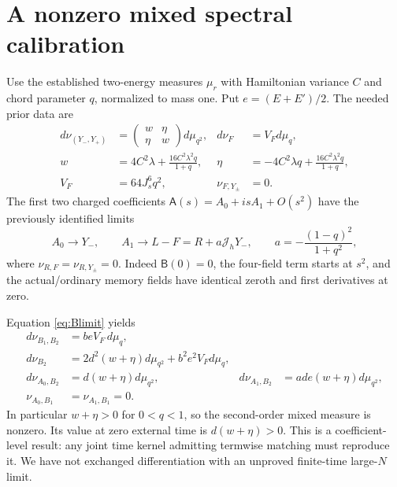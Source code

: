 \documentclass[11pt,a4paper]{article}
\newcommand{\AA}{\mathsf A}
\newcommand{\BB}{\mathsf B}
\newcommand{\Jh}{\mathcal J_h}
\begin{document}
\section{A nonzero mixed spectral calibration}
Use the established two-energy measures $\mu_r$ with Hamiltonian
variance $C$ and chord parameter $q$, normalized to mass one.
Put $e=(E+E')/2$. The needed prior data \cite{Central,Mixed} are
\begin{align}
 d\nu_{(Y_-,Y_+)}&=
 \begin{pmatrix}w&\eta\\\eta&w\end{pmatrix}d\mu_{q^2},
 &d\nu_F&=V_Fd\mu_q,\\
 w&=4C^2\lambda+\frac{16C^2\lambda^2q}{1+q},
 &\eta&=-4C^2\lambda q+\frac{16C^2\lambda^2q}{1+q},\\
 V_F&=64J_s^6q^2,&\nu_{F,Y_\pm}&=0.
\end{align}
The first two charged coefficients $\AA(s)=A_0+isA_1+O(s^2)$
have the previously identified limits
\begin{equation}
 A_0\to Y_-,\qquad A_1\to L-F=R+a\Jh Y_-,\qquad
 a=-\frac{(1-q)^2}{1+q^2},
\end{equation}
where $\nu_{R,F}=\nu_{R,Y_\pm}=0$. Indeed $\BB(0)=0$, the
four-field term starts at $s^2$, and the actual/ordinary memory
fields have identical zeroth and first derivatives at zero.

Equation \eqref{eq:Blimit} yields
\begin{align}
 d\nu_{B_1,B_2}&=b e V_F\,d\mu_q,\\
 d\nu_{B_2}&=2d^2(w+\eta)d\mu_{q^2}+b^2e^2V_Fd\mu_q,\\
 d\nu_{A_0,B_2}&=d(w+\eta)d\mu_{q^2},&
 d\nu_{A_1,B_2}&=ad e(w+\eta)d\mu_{q^2},\\
 \nu_{A_0,B_1}&=\nu_{A_1,B_1}=0.
\end{align}
In particular $w+\eta>0$ for $0<q<1$, so the second-order mixed
measure is nonzero. Its value at zero external time is
$d(w+\eta)>0$. This is a coefficient-level result: any joint
time kernel admitting termwise matching must reproduce it.
We have not exchanged differentiation with an unproved
finite-time large-$N$ limit.
\end{document}
